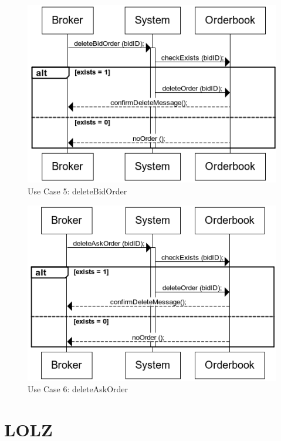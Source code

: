 \documentclass[a4paper]{article}
\begin{document}
\begin{figure}
  \caption{Use Case 5: deleteBidOrder}
  \centering
    \includegraphics[width=1\textwidth]{images/deleteBidOrder}
\end{figure}

\begin{figure}
  \caption{Use Case 6: deleteAskOrder}
  \centering
    \includegraphics[width=1\textwidth]{images/deleteAskOrder}
\end{figure}




\section{LOLZ}
\end{document}
